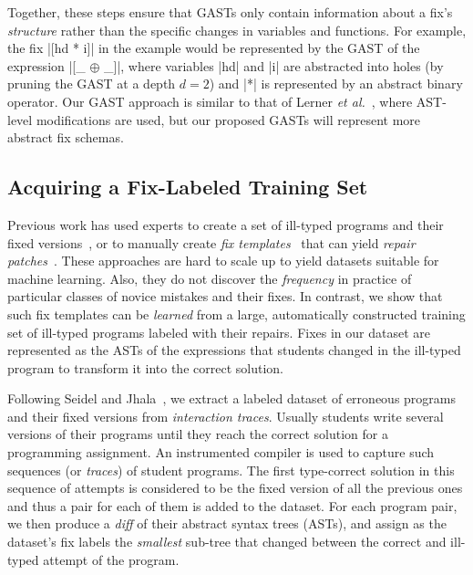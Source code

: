 Together, these steps ensure that GASTs only contain information about a fix's
\emph{structure} rather than the specific changes in variables and functions.
%
For example, the fix |[hd * i]| in the \mbd example would be represented by the
GAST of the expression |[_ $\oplus$ _]|, where variables |hd| and |i| are
abstracted into holes (\eg by pruning the GAST at a depth $d=2$) and |*| is
represented by an abstract binary operator. Our GAST approach is similar to
that of Lerner \emph{et al.}~\citep{Lerner2007-dt}, where AST-level modifications are used, but our proposed
GASTs will represent more abstract fix schemas.


\subsection{Acquiring a Fix-Labeled Training Set}
\label{sec:overview:data}

Previous work has used experts to create a set of ill-typed programs and their
fixed versions~\citep[][]{Lerner2007-dt, Loncaric2016-uk}, or to manually create
\emph{fix templates}~\cite{kim13par} that can yield \emph{repair
patches}~\citep[][]{martinez2013automatically,martinez2015mining}.
%
These approaches are hard to scale up to yield datasets suitable for machine
learning. Also, they do not discover the \emph{frequency} in practice of particular
classes of novice mistakes and their fixes.
%
In contrast, we show that such fix templates can be \emph{learned} from a large,
automatically constructed training set of ill-typed programs labeled with their
repairs.
%
Fixes in our dataset are represented as the ASTs of the expressions that students
changed in the ill-typed program to transform it into the correct solution.

Following Seidel and Jhala~\citep{Seidel:2017}, we extract a labeled
dataset of erroneous programs
and their fixed versions from \emph{interaction traces}. Usually students write
several versions of their programs until they reach the correct solution for a
programming assignment. An instrumented compiler is used to capture such
sequences (or \emph{traces}) of student programs. The first type-correct
solution in this sequence of attempts is considered to be the fixed
version of all the previous ones and thus a pair for each of them is added to
the dataset. For each program pair, we then produce a \emph{diff} of their
abstract syntax trees (ASTs), and assign as the dataset's fix labels the
\emph{smallest} sub-tree that changed between the correct and ill-typed attempt
of the program.


